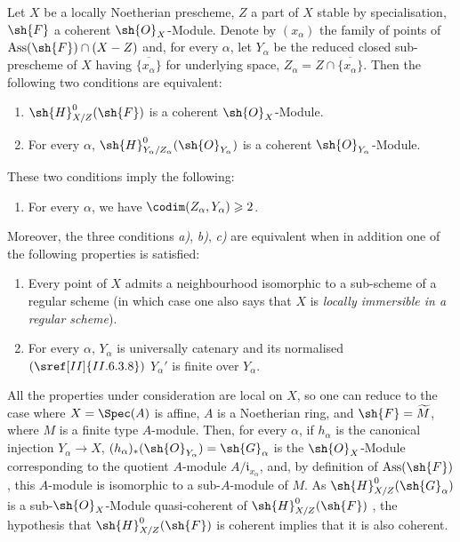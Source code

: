 \begin{proposition}[5.11.1]
\label{IV.5.11.1}
Let $X$ be a locally Noetherian prescheme, $Z$ a part of $X$ stable by specialisation, $\sh{F}$ a coherent $\sh{O}_X$-Module.
Denote by $(x_\alpha)$ the family of points of $\operatorname{Ass}(\sh{F})\cap(X-Z)$ and, for every $\alpha$, let $Y_\alpha$ be the reduced closed sub-prescheme of $X$ having $\overline{\{x_\alpha\}}$ for underlying space, $Z_\alpha=Z\cap\overline{\{x_\alpha\}}$.
Then the following two conditions are equivalent:
\begin{enumerate}[label=\emph{\alph*)}]
  \item $\sh{H}^0_{X/Z}(\sh{F})$ is a coherent $\sh{O}_X$-Module.
  \item For every $\alpha$, $\sh{H}^0_{Y_\alpha/Z_\alpha}(\sh{O}_{Y_\alpha})$ is a coherent $\sh{O}_{Y_\alpha}$-Module.
\end{enumerate}
These two conditions imply the following:
\begin{enumerate}
  \item[\rm c)] For every $\alpha$, we have $\codim(Z_\alpha,Y_\alpha)\geqslant 2$.
\end{enumerate}
Moreover, the three conditions \emph{a)}, \emph{b)}, \emph{c)} are equivalent when in addition one of the following properties is satisfied:
\begin{enumerate}
  \item[\rm(i)] Every point of $X$ admits a neighbourhood isomorphic to a sub-scheme of a regular scheme (in which case one also says that $X$ is \emph{locally immersible in a regular scheme}).
  \item[\rm(ii)] For every $\alpha$, $Y_\alpha$ is universally catenary  and its normalised $(\sref[II]{II.6.3.8})$ $Y_\alpha'$ is finite over $Y_\alpha$.
\end{enumerate}
All the properties under consideration are local on $X$, so one can reduce to the case where $X=\Spec(A)$ is affine, $A$ is a Noetherian ring, and $\sh{F}=\widetilde{M}$, where $M$ is a finite type $A$-module.
Then, for every $\alpha$, if $h_\alpha$ is the canonical injection $Y_\alpha\to X$, $(h_\alpha)_*(\sh{O}_{Y_\alpha})=\sh{G}_\alpha$ is the $\sh{O}_X$-Module corresponding to the quotient $A$-module $A/\mathfrak{i}_{x_\alpha}$, and, by definition of $\operatorname{Ass}(\sh{F})$, this $A$-module is isomorphic to a sub-$A$-module of $M$.
As $\sh{H}^0_{X/Z}(\sh{G}_\alpha)$ is a sub-$\sh{O}_X$-Module quasi-coherent of $\sh{H}^0_{X/Z}(\sh{F})$ , the hypothesis that $\sh{H}^0_{X/Z}(\sh{F})$ is coherent implies that it is also coherent.

\end{proposition}

